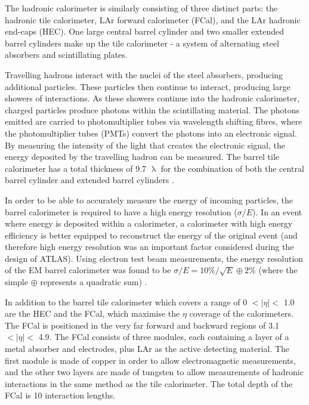\documentclass[12pt,a4paper,epsf,portrait,times,epsfig]{article}
\begin{document}
		The hadronic calorimeter is similarly consisting of three distinct parts: the hadronic tile calorimeter, LAr forward calorimeter (FCal), and the LAr hadronic end-caps (HEC). One large central barrel cylinder and two smaller extended barrel cylinders make up the tile calorimeter - a system of alternating steel absorbers and scintillating
		plates. \par
		
		Travelling hadrons interact with the nuclei of the steel absorbers, producing additional particles. These particles then continue to interact, producing large showers of interactions. As these showers continue into the hadronic calorimeter, charged particles produce
		photons within the scintillating material. The photons emitted are carried to photomultiplier tubes via wavelength shifting fibres, where the photomultiplier tubes (PMTs) convert the photons into an electronic signal. By measuring the intensity of the light that creates the electronic signal, the energy deposited by the travelling hadron can be
		measured. The barrel tile calorimeter has a total thickness of 9.7 $\uplambda$ for the combination of both the central barrel cylinder and extended barrel cylinders 
		\cite{ATLAS-TDR-01, ATLAS-TDR-02, Article:ATLASDesignPaper}. \par 
		
		In order to be able to accurately measure the energy of incoming particles, the barrel calorimeter is required to have a high energy resolution ($\sigma/E$). In an event where energy is deposited within a calorimeter, a calorimeter with high energy efficiency is better equipped to reconstruct the energy of the original event (and therefore high energy resolution was an important factor considered during the design of ATLAS). Using electron test beam measurements, the energy resolution of the EM barrel calorimeter was found to be $\sigma/E = 10\%/\sqrt{E} \oplus 2\%$ (where the simple $\oplus$ represents a quadratic sum) \cite{Article:ECALCalibration}. 
		
		In addition to the barrel tile calorimeter which covers a range of 0 $< |\eta| <$ 1.0 are the HEC and the FCal, which maximise the $\eta$ coverage of the calorimeters. The FCal is positioned in the very far forward and backward regions of 3.1 $< |\eta| <$ 4.9. The FCal consists of three modules, each containing a layer of a metal absorber and electrodes, plus LAr as the active detecting material. The first module is made of copper in order to allow electromagnetic measurements, and the other two layers are made of tungsten to allow measurements of hadronic interactions in the same method as the tile calorimeter. The total depth of the FCal is 10 interaction lengths. \par
		
\end{document}

